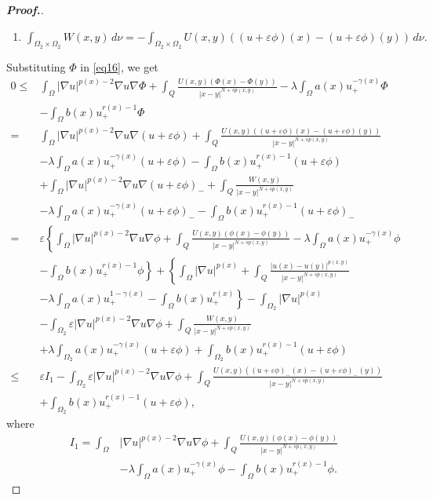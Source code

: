 \documentclass[11pt]{article}
\newcommand{\Q}{\textit{Q}}
\newcommand{\ve}{\varepsilon}
\newcommand{\ga} {\gamma}
\newcommand{\om} {\Omega}
\newcommand{\la} {\lambda}
\newcommand{\na} {\nabla}
\newcommand{\ds} {\displaystyle}
\newcommand{\grad}{\nabla}
\begin{document}
\begin{proof}[\bf Proof.]
\begin{enumerate}
\item[(vii)]$\ds 
\int_{\om_2\times\om_2}W(x,y)\,d\nu=-
\int_{\om_2\times\om_2}U(x,y)((u+\ve\phi)(x)
-(u+\ve\phi)(y)) \,d\nu.$
\end{enumerate}
Substituting $\Phi$
in \eqref{eq16}, we get
\begin{align*}
    0\le&
\int_\om|\grad u|^{p(x)-2}\na u\na\Phi+
\int_{\Q} 
\frac{U(x,y)(\Phi(x)
-\Phi(y))}{|x-y|^{N+sp(x,y)}}\nonumber -\la
\int_\om a(x)u_+^{-\ga(x)}\Phi \\
&-\int_\om b(x)u_+^{r(x)-1}\Phi\\
    =&
\int_\om|\grad u|^{p(x)-2}\na u\na(u+\ve\phi)+
\int_{\Q} 
\frac{U(x,y)((u+\ve\phi)(x)-
(u+\ve\phi)(y))}{|x-y|^{N+sp(x,y)}}\\
    &-\la
\int_\om a(x)u_+^{-\ga(x)}(u+\ve\phi) -
\int_\om b(x)u_+^{r(x)-1}(u+\ve\phi) \\
 &+
\int_\om|\grad u|^{p(x)-2}\na u\na(u+\ve\phi)_- 
+
\int_{\Q} 
\frac{W(x,y)}
{|x-y|^{N+sp(x,y)}} \\
&   -\la
\int_\om a(x)u_+^{-\ga(x)}(u+\ve\phi)_- -
\int_\om b(x)u_+^{r(x)-1}(u+\ve\phi)_-\\
    =&\ve \left\{
\int_\om|\grad u|^{p(x)-2}\na u\na\phi+
\int_{\Q} 
\frac{U(x,y)(\phi(x)-\phi(y))}{|x-y|^{N+sp(x,y)}}-\la
\int_\om a(x)u_+^{-\ga(x)}\phi \right. \\
& \left. -
\int_\om b(x)u_+^{r(x)-1}\phi\right\} +
\left\{ \int_\om|\grad u|^{p(x)}+
\int_{\Q} 
\frac{|u(x)-u(y)|^{p(x,y)}}{|x-y|^{N+sp(x,y)}} \right.\\
& \left. -\la
\int_\om a(x)u_+^{1-\ga(x)}-
\int_\om b(x)u_+^{r(x)} \right\} -
\int_{\om_2}|\grad u|^{p(x)}\\
    &-
\int_{\om_2}\ve|\na u|^{p(x)-2}\na u\na \phi+
\int_{\Q} 
\frac{W(x,y)}{|x-y|^{N+sp(x,y)}}\\
    &+\la
\int_{\om_2} a(x)u_+^{-\ga(x)}(u+\ve\phi)+
\int_{\om_2} b(x)u_+^{r(x)-1}(u+\ve\phi)\\
    \le& \ve I_1-
\int_{\om_2}\ve|\na u|^{p(x)-2}\na u\na \phi+
\int_{\Q} 
\frac{U(x,y)((u+\ve\phi)_-(x)-(u+\ve\phi)_-(y))}
{|x-y|^{N+sp(x,y)}}\\
    &+
\int_{\om_2} b(x)u_+^{r(x)-1}(u+\ve\phi),
\end{align*}
where 
\begin{equation*}
\begin{aligned}
I_1 =
\int_\om&|\grad u|^{p(x)-2}\na u\na\phi+
\int_{\Q} 
\frac{U(x,y)(\phi(x)-\phi(y))}{|x-y|^{N+sp(x,y)}} \\
&-\la
\int_\om a(x)u_+^{-\ga(x)}\phi -
\int_\om b(x)u_+^{r(x)-1}\phi.
\end{aligned}
\end{equation*}



\end{proof}
\end{document}
